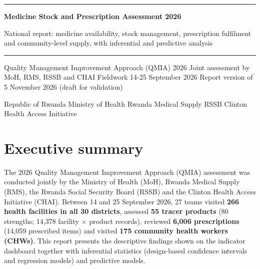 \documentclass[10pt,a4paper]{report}
\begin{document}
\begin{titlepage}\vspace*{2.5cm}
{\color{navy}\rule{\linewidth}{2pt}}\par\vspace{14pt}
{\raggedright{}\Huge\bfseries\color{navy} Medicine Stock and Prescription Assessment 2026\par}\vspace{10pt}
{\raggedright{}\Large\color{navy} National report: medicine availability, stock management, prescription fulfilment and community-level supply, with inferential and predictive analysis\par}\vspace{14pt}
{\color{navy}\rule{\linewidth}{0.8pt}}\par\vspace{20pt}
{\normalsize Quality Management Improvement Approach (QMIA) 2026 \textperiodcentered{} Joint assessment by MoH, RMS, RSSB and CHAI \textperiodcentered{} Fieldwork 14-25 September 2026 \textperiodcentered{} Report version of 5 November 2026 (draft for validation)\par}
\vfill{\small\color{gray} Republic of Rwanda \textperiodcentered{} Ministry of Health \textperiodcentered{} Rwanda Medical Supply \textperiodcentered{} RSSB \textperiodcentered{} Clinton Health Access Initiative\par}
\end{titlepage}
\tableofcontents
\listoftables
\listoffigures
\clearpage{}

\chapter*{Executive summary}
The 2026 Quality Management Improvement Approach (QMIA) assessment was conducted jointly by the Ministry of Health (MoH), Rwanda Medical Supply (RMS), the Rwanda Social Security Board (RSSB) and the Clinton Health Access Initiative (CHAI). Between 14 and 25 September 2026, 27 teams visited \textbf{266 health facilities in all 30 districts}, assessed \textbf{55 tracer products} (80 strengths; 14,378 facility $\times$ product records), reviewed \textbf{6,006 prescriptions} (14,059 prescribed items) and visited \textbf{175 community health workers (CHWs)}. This report presents the descriptive findings shown on the indicator dashboard together with inferential statistics (design-based confidence intervals and regression models) and predictive models.
\end{document}
